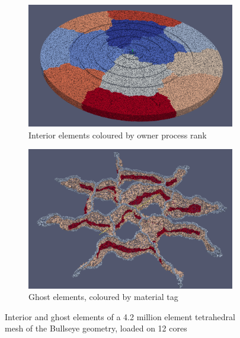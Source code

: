 \begin{figure}
    \centering
	\begin{subfigure}[b]{0.45\textwidth} \hspace{3mm} \includegraphics[scale=0.20]{images/bullseye-core-angle}          \captionsetup{width=0.8\textwidth} \caption{Interior elements coloured by owner process rank}   \end{subfigure}
	\begin{subfigure}[b]{0.45\textwidth} \hspace{3mm} \includegraphics[scale=0.17]{images/bullseye-ghostelements-angle}  \captionsetup{width=0.8\textwidth} \caption{Ghost elements, coloured by material tag} \end{subfigure}
	\caption{Interior and ghost elements of a 4.2 million element tetrahedral mesh of the Bullseye geometry, loaded on 12 cores}
	\label{fig:result:bullseye}
\end{figure}

